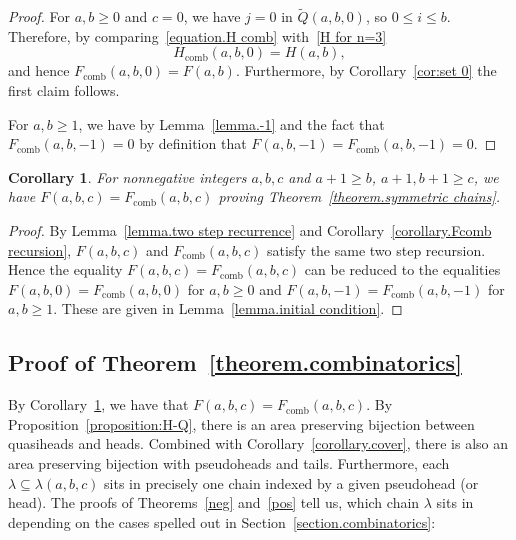 \documentclass[11pt,reqno]{amsart}
\newcommand{\comb}{\operatorname{comb}}
\newtheorem{corollary}[theorem]{Corollary}
\theoremstyle{definition}
\numberwithin{equation}{section}
\begin{document}
\begin{proof}
For $a,b\geqslant 0$ and $c=0$, we have $j=0$ in $\widetilde{Q}(a,b,0)$, so $0\leqslant i\leqslant b$. Therefore, by 
comparing~\eqref{equation.H comb} with~\eqref{H for n=3}
\[
	H_{\comb}(a,b,0)=H(a,b),
\]
and hence $F_{\comb}(a,b,0)=F(a,b)$. Furthermore, by Corollary~\ref{cor:set 0} the first claim follows.

For $a,b\geqslant 1$, we have by Lemma~\ref{lemma.-1} and the fact that $F_{\comb}(a,b,-1)=0$ by definition
that $F(a,b,-1)=F_{\comb}(a,b,-1)=0$.
\end{proof}

\begin{corollary}
\label{corollary.F=Fcomb}
For nonnegative integers $a,b,c$ and $a+1 \geqslant b$, $a+1,b+1 \geqslant c$, we have $F(a,b,c) = F_{\comb}(a,b,c)$ 
proving Theorem~\ref{theorem.symmetric chains}.
\end{corollary}

\begin{proof}
By Lemma~\ref{lemma.two step recurrence} and Corollary~\ref{corollary.Fcomb recursion}, $F(a,b,c)$ and 
$F_{\comb}(a,b,c)$ satisfy the same two step recursion. Hence the equality $F(a,b,c) = F_{\comb}(a,b,c)$ 
can be reduced to the equalities $F(a,b,0) = F_{\comb}(a,b,0)$ for $a,b\geqslant 0$ and 
$F(a,b,-1) = F_{\comb}(a,b,-1)$ for $a,b\geqslant 1$. These are given in Lemma~\ref{lemma.initial condition}.
\end{proof}

\subsection{Proof of Theorem~\ref{theorem.combinatorics}}
\label{section.proof comb}

By Corollary~\ref{corollary.F=Fcomb}, we have that $F(a,b,c)=F_{\comb}(a,b,c)$. By Proposition~\ref{proposition:H-Q},
there is an area preserving bijection between quasiheads and heads. Combined with 
Corollary~\ref{corollary.cover}, there is also an area preserving bijection with pseudoheads and tails.
Furthermore, each $\lambda \subseteq \lambda(a,b,c)$ sits in precisely one chain indexed by
a given pseudohead (or head). The proofs of Theorems~\ref{neg} and~\ref{pos} tell us, which chain $\lambda$ sits in
depending on the cases spelled out in Section~\ref{section.combinatorics}:
\end{document}
